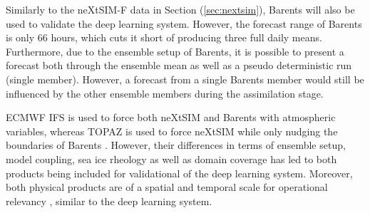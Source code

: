\documentclass[../main/thesis.tex]{subfiles}
\begin{document}
Similarly to the neXtSIM-F data in Section (\ref{sec:nextsim}), Barents will also be used to validate the deep learning system. However, the forecast range of Barents is only 66 hours, which cuts it short of producing three full daily means. Furthermore, due to the ensemble setup of Barents, it is possible to present a forecast both through the ensemble mean as well as a pseudo deterministic run (single member). However, a forecast from a single Barents member would still be influenced by the other ensemble members during the assimilation stage. 

ECMWF IFS is used to force both neXtSIM and Barents with atmospheric variables, whereas TOPAZ \citep{Sakov2012} is used to force neXtSIM \citep{Williams2021} while only nudging the boundaries of Barents \citep{Roehrs2022}. However, their differences in terms of ensemble setup, model coupling, sea ice rheology as well as domain coverage has led to both products being included for validational of the deep learning system. Moreover, both physical products are of a spatial and temporal scale for operational relevancy \citep{Wagner2020}, similar to the deep learning system. 





\biblio
\end{document}
